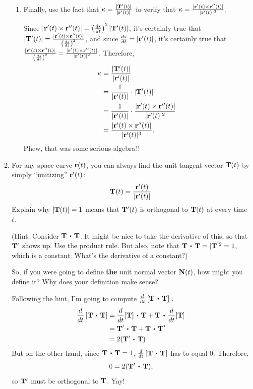 \begin{enumerate}[leftmargin=0pt]
{\begin{enumerate}
        \item Finally, use the fact that $\kappa = \frac{\lvert \mathbf{T}'(t) \rvert }{\lvert \mathbf{r}'(t) \rvert}$ to verify that $\kappa = \frac{\lvert \mathbf{r}'(t) \times \mathbf{r}''(t) \rvert}{\lvert \mathbf{r}'(t) \rvert^3}.$
        
        \begin{red}
            Since $\lvert \mathbf{r}'(t) \times \mathbf{r}''(t) \rvert = \left(\frac{ds}{dt}\right)^2 \lvert \mathbf{T}'(t) \rvert$, it's certainly true that $|\mathbf{T}'(t)| = \frac{\lvert \mathbf{r}'(t) \times \mathbf{r}''(t) \rvert}{\left(\frac{ds}{dt}\right)^2}$, and since $\frac{ds}{dt} = |\mathbf{r}'(t)|$, it's certainly true that $\frac{\lvert \mathbf{r}'(t) \times \mathbf{r}''(t) \rvert}{\left(\frac{ds}{dt}\right)^2} = \frac{\lvert \mathbf{r}'(t) \times \mathbf{r}''(t) \rvert}{|\mathbf{r}'(t)|^2}$. Therefore,
            \begin{align*}
                \kappa &= \frac{\lvert \mathbf{T}'(t) \rvert }{\lvert \mathbf{r}'(t) \rvert} \\
                &= \frac{1}{\lvert \mathbf{r}'(t) \rvert} \cdot |\mathbf{T}'(t)| \\
                &=  \frac{1}{\lvert \mathbf{r}'(t) \rvert} \cdot \frac{\lvert \mathbf{r}'(t) \times \mathbf{r}''(t) \rvert}{|\mathbf{r}'(t)|^2} \\
                &= \frac{\lvert \mathbf{r}'(t) \times \mathbf{r}''(t) \rvert}{|\mathbf{r}'(t)|^3}.
            \end{align*}
            Phew, that was some serious algebra!!
        \end{red}
    \end{enumerate}
    }


    \item For any space curve $\mathbf{r}(t)$, you can always find the unit tangent vector $\mathbf{T}(t)$ by simply ``unitizing'' $\mathbf{r}'(t)$:
    \[\mathbf{T}(t) = \frac{\mathbf{r}'(t)}{|\mathbf{r}'(t)|}\]
    Explain why $|\mathbf{T}(t)| = 1$ means that $\mathbf{T}'(t)$ is orthogonal to $\mathbf{T}(t)$ at every time $t$.
    
    (Hint: Consider $\vT \dotp \vT$. It might be nice to take the derivative of this, so that $\mathbf{T}'$ shows up. Use the product rule. But also, note that $\vT \dotp \vT = |\vT|^2 = 1$, which is a constant. What's the derivative of a constant?)
    
    So, if you were going to define \textbf{the} unit normal vector $\mathbf{N}(t)$, how might you define it? Why does your definition make sense?
    
    \begin{red}
        Following the hint, I'm going to compute $\frac{d}{dt} \left[ \vT \dotp \vT\right]:$
        \begin{align*}
            \frac{d}{dt} \left[ \vT \dotp \vT\right] &= 
            \frac{d}{dt}[\vT] \dotp \vT + \vT \dotp \frac{d}{dt}[\vT]\\
            &= \vT' \dotp \vT + \vT \dotp \vT' \\
            &= 2 (\vT' \dotp \vT)
        \end{align*}
        But on the other hand, since $\vT \dotp \vT = 1$, $\frac{d}{dt} \left[ \vT \dotp \vT\right]$ has to equal 0. Therefore, 
        \[0 = 2 (\vT' \dotp \vT),\]
        so $\mathbf{T}'$ must be orthogonal to $\mathbf{T}$. Yay!
        

\end{red}
\end{enumerate}
